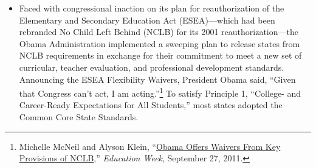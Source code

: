 \documentclass[12pt]{article}
\begin{document}
\begin{itemize}
\item Faced with congressional inaction on its plan for reauthorization of the Elementary and Secondary Education Act (ESEA)---which had been rebranded No Child Left Behind (NCLB) for its 2001 reauthorization---the Obama Administration implemented a sweeping plan to release states from NCLB requirements in exchange for their commitment to meet a new set of curricular, teacher evaluation, and professional development standards. Announcing the ESEA Flexibility Waivers, President Obama said, ``Given that Congress can’t act, I am acting.''\footnote{Michelle McNeil and Alyson Klein, ``\href{https://www.edweek.org/ew/articles/2011/09/28/05waiver_ep.h31.html}{Obama Offers Waivers From Key Provisions of NCLB},'' \emph{Education Week}, September 27, 2011.} To satisfy Principle 1, ``College- and Career-Ready Expectations for All Students,'' most states adopted the Common Core State Standards.


\end{itemize}
\end{document}
